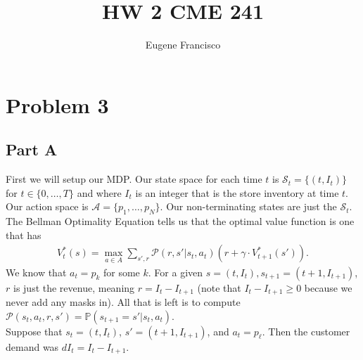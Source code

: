 \documentclass{article}
\title{HW 2 CME 241}
\author{Eugene Francisco}
\date{}
\begin{document}
\maketitle

\section*{Problem 3}
\subsection*{Part A}
First we will setup our MDP. Our state space for each time $t$ is $\mathcal{S}_t = \{(t, I_t)\}$ for $t\in \{0,\ldots, T\}$ and where $I_t$ is an integer that is the store inventory at time $t$. Our action space is $\mathcal{A} = \{p_1,\ldots, p_N\}$. Our non-terminating states are just the $\mathcal{S}_t$. The Bellman Optimality Equation tells us that the optimal value function is one that has
\begin{align*}
	V_t^*(s) = \max_{a\in A}\sum_{s', r}\mathcal{P}(r, s'| s_t, a_t)(r + \gamma\cdot V_{t + 1}^*(s'))\tag{3.a.1}.
\end{align*}
We know that $a_t = p_k$ for some $k$. For a given $s = (t, I_t), s_{t + 1} = (t + 1, I_{t + 1})$, $r$ is just the revenue, meaning $r = I_t - I_{t + 1}$ (note that $I_t - I_{t + 1} \geq 0$ because we never add any masks in). All that is left is to compute $\mathcal{P}(s_t, a_t, r, s') = \mathbb{P}(s_{t + 1} = s'| s_t, a_t)$.\\

Suppose that $s_t = (t, I_t)$, $s' = (t + 1, I_{t + 1})$, and $a_t = p_\ell$. Then the customer demand was $dI_t = I_t - I_{t + 1}$.\\
\end{document}
